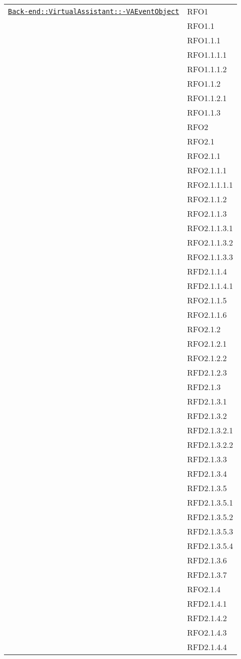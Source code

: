 \begin{longtable}{|>{\centering}m{10cm}|m{3cm}<{\centering}|}
\hyperref[Back-end::VirtualAssistant::VAEventObject]{\texttt{Back-end::VirtualAssistant::-\linebreak VAEventObject}} & RFO1\\
& RFO1.1\\
& RFO1.1.1\\
& RFO1.1.1.1\\
& RFO1.1.1.2\\
& RFO1.1.2\\
& RFO1.1.2.1\\
& RFO1.1.3\\
& RFO2\\
& RFO2.1\\
& RFO2.1.1\\
& RFO2.1.1.1\\
& RFO2.1.1.1.1\\
& RFO2.1.1.2\\
& RFO2.1.1.3\\
& RFO2.1.1.3.1\\
& RFO2.1.1.3.2\\
& RFO2.1.1.3.3\\
& RFD2.1.1.4\\
& RFD2.1.1.4.1\\
& RFO2.1.1.5\\
& RFO2.1.1.6\\
& RFO2.1.2\\
& RFO2.1.2.1\\
& RFO2.1.2.2\\
& RFD2.1.2.3\\
& RFD2.1.3\\
& RFD2.1.3.1\\
& RFD2.1.3.2\\
& RFD2.1.3.2.1\\
& RFD2.1.3.2.2\\
& RFD2.1.3.3\\
& RFD2.1.3.4\\
& RFD2.1.3.5\\
& RFD2.1.3.5.1\\
& RFD2.1.3.5.2\\
& RFD2.1.3.5.3\\
& RFD2.1.3.5.4\\
& RFD2.1.3.6\\
& RFD2.1.3.7\\
& RFO2.1.4\\
& RFD2.1.4.1\\
& RFD2.1.4.2\\
& RFO2.1.4.3\\
& RFD2.1.4.4\\

\end{longtable}
